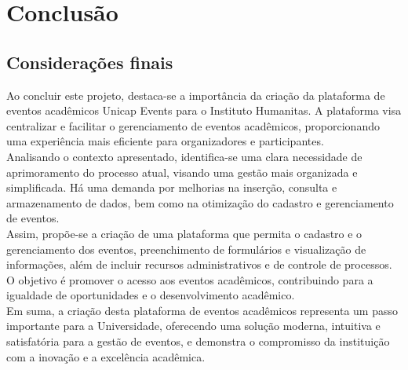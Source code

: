 \chapter{Conclusão}

\section{Considerações finais}

Ao concluir este projeto, destaca-se a importância da criação da plataforma de eventos acadêmicos Unicap Events para o Instituto Humanitas. A plataforma visa centralizar e facilitar o gerenciamento de eventos acadêmicos, proporcionando uma experiência mais eficiente para organizadores e participantes. \\

Analisando o contexto apresentado, identifica-se uma clara necessidade de aprimoramento do processo atual, visando uma gestão mais organizada e simplificada. Há uma demanda por melhorias na inserção, consulta e armazenamento de dados, bem como na otimização do cadastro e gerenciamento de eventos. \\

Assim, propõe-se a criação de uma plataforma que permita o cadastro e o gerenciamento dos eventos, preenchimento de formulários e visualização de informações, além de incluir recursos administrativos e de controle de processos. O objetivo é promover o acesso aos eventos acadêmicos, contribuindo para a igualdade de oportunidades e o desenvolvimento acadêmico. \\

Em suma, a criação desta plataforma de eventos acadêmicos representa um passo importante para a Universidade, oferecendo uma solução moderna, intuitiva e satisfatória para a gestão de eventos, e demonstra o compromisso da instituição com a inovação e a excelência acadêmica. \\
